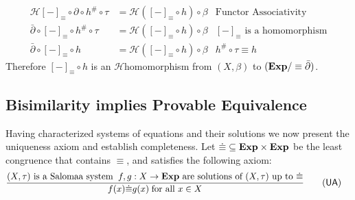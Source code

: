 \documentclass[a4paper,UKenglish,cleveref, autoref, thm-restate]{lipics-v2021}
\newcommand{\Exp}{\textbf{\upshape{Exp}}}
\newcommand{\HCo}{$\mathcal{H}$\text{-coalgebra }}
\theoremstyle{plain}\newtheoremrep{thm}{Theorem}[section]
\begin{document}
\begin{appendixproof}
\begin{align*}
			\mathcal{H}[-]_\equiv \circ \partial \circ h^{\#}\circ \tau &= \mathcal{H}([-]_\equiv \circ h) \circ \beta & \text{Functor Associativity}\\
			\bar\partial \circ [-]_\equiv \circ h^{\#}\circ \tau &= \mathcal{H}([-]_\equiv \circ h) \circ \beta & [-]_\equiv \text{ is a homomorphism}\\
			\bar\partial \circ [-]_\equiv \circ h &= \mathcal{H}([-]_\equiv \circ h) \circ \beta & h^{\#}\circ \tau \equiv h
		\end{align*}
		Therefore $[-]_\equiv \circ h$ is an \HCo  homomorphism from $(X, \beta)$ to $(\Exp/\equiv \bar\partial)$.
	\end{appendixproof}

	\subsection{Bisimilarity implies Provable Equivalence} 
	Having characterized systems of equations and their solutions we now present the uniqueness axiom and establish completeness. Let $\dot\equiv \subseteq \Exp \times \Exp$ be the least congruence that contains $\equiv$, and satisfies the following axiom:
	\begin{align*}
		&\frac{(X, \tau) \text{ is a Salomaa system}\;\;f,g:X\to\Exp \text{ are solutions of }(X, \tau) \text{ up to } \dot\equiv}{f(x) \dot\equiv g(x)\; \text{for all } x\in X} \tag{\textsf{UA}}
	\end{align*}
	
\end{document}
